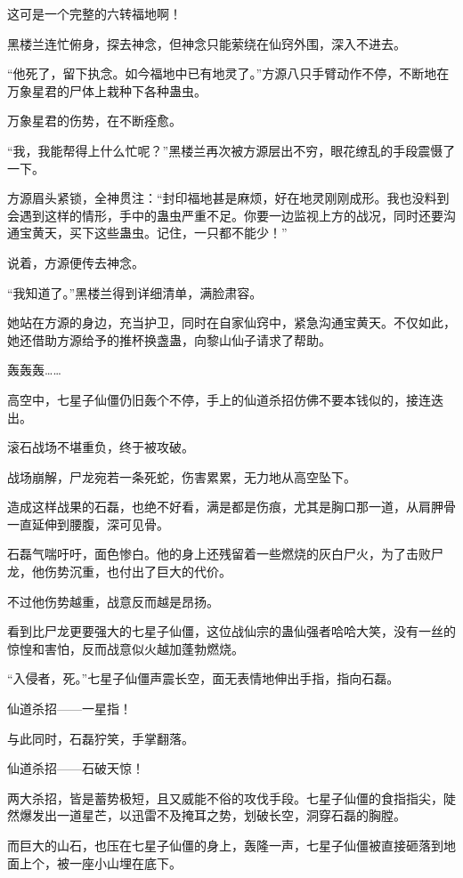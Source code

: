 \begin{this_body}
这可是一个完整的六转福地啊！

黑楼兰连忙俯身，探去神念，但神念只能萦绕在仙窍外围，深入不进去。

“他死了，留下执念。如今福地中已有地灵了。”方源八只手臂动作不停，不断地在万象星君的尸体上栽种下各种蛊虫。

万象星君的伤势，在不断痊愈。

“我，我能帮得上什么忙呢？”黑楼兰再次被方源层出不穷，眼花缭乱的手段震慑了一下。

方源眉头紧锁，全神贯注：“封印福地甚是麻烦，好在地灵刚刚成形。我也没料到会遇到这样的情形，手中的蛊虫严重不足。你要一边监视上方的战况，同时还要沟通宝黄天，买下这些蛊虫。记住，一只都不能少！”

说着，方源便传去神念。

“我知道了。”黑楼兰得到详细清单，满脸肃容。

她站在方源的身边，充当护卫，同时在自家仙窍中，紧急沟通宝黄天。不仅如此，她还借助方源给予的推杯换盏蛊，向黎山仙子请求了帮助。

轰轰轰……

高空中，七星子仙僵仍旧轰个不停，手上的仙道杀招仿佛不要本钱似的，接连迭出。

滚石战场不堪重负，终于被攻破。

战场崩解，尸龙宛若一条死蛇，伤害累累，无力地从高空坠下。

造成这样战果的石磊，也绝不好看，满是都是伤痕，尤其是胸口那一道，从肩胛骨一直延伸到腰腹，深可见骨。

石磊气喘吁吁，面色惨白。他的身上还残留着一些燃烧的灰白尸火，为了击败尸龙，他伤势沉重，也付出了巨大的代价。

不过他伤势越重，战意反而越是昂扬。

看到比尸龙更要强大的七星子仙僵，这位战仙宗的蛊仙强者哈哈大笑，没有一丝的惊惶和害怕，反而战意似火越加蓬勃燃烧。

“入侵者，死。”七星子仙僵声震长空，面无表情地伸出手指，指向石磊。

仙道杀招——一星指！

与此同时，石磊狞笑，手掌翻落。

仙道杀招——石破天惊！

两大杀招，皆是蓄势极短，且又威能不俗的攻伐手段。七星子仙僵的食指指尖，陡然爆发出一道星芒，以迅雷不及掩耳之势，划破长空，洞穿石磊的胸膛。

而巨大的山石，也压在七星子仙僵的身上，轰隆一声，七星子仙僵被直接砸落到地面上个，被一座小山埋在底下。


\end{this_body}
